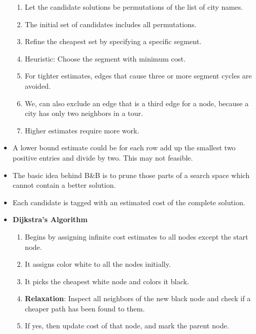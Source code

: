 \documentclass[a4paper]{article}
\begin{document}
\begin{itemize}
    \begin{enumerate}
        \item Let the candidate solutions be permutations of the list of city names.
        \item The initial set of candidates includes all permutations.
        \item Refine the cheapest set by specifying a specific segment.
        \item Heuristic: Choose the segment with minimum cost.
        \item For tighter estimates, edges that cause three or more segment cycles are avoided.
        \item We, can also exclude an edge that is a third edge for a node, because a city has only two neighbors in a tour.
        \item Higher estimates require more work.
    \end{enumerate}
    \item A lower bound estimate could be for each row add up the smallest two positive entries and divide by two. This may not feasible.
    \item The basic idea behind B\&B is to prune those parts of a search space which cannot contain a better solution.
    \item Each candidate is tagged with an estimated cost of the complete solution.
    \item \textbf{Dijkstra's Algorithm}
    \begin{enumerate}
        \item Begins by assigning infinite cost estimates to all nodes except the start node.
        \item It assigns color white to all the nodes initially.
        \item It picks the cheapest white node and colors it black.
        \item \textbf{Relaxation}: Inspect all neighbors of the new black node and check if a cheaper path has been found to them.
        \item If yes, then update cost of that node, and mark the  parent node.
    \end{enumerate}
\end{itemize}
\end{document}

